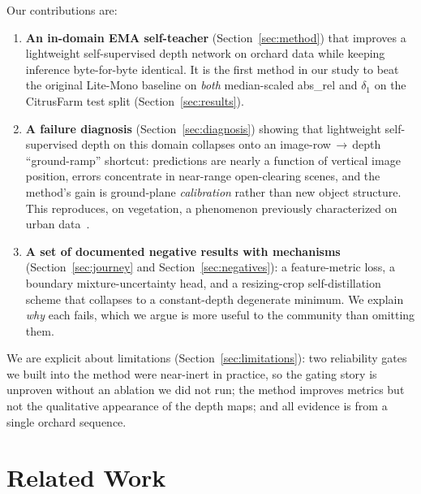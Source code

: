 \documentclass[conference]{IEEEtran}
\begin{document}
Our contributions are:
\begin{enumerate}
\item \textbf{An in-domain EMA self-teacher} (Section~\ref{sec:method}) that
improves a lightweight self-supervised depth network on orchard data while
keeping inference byte-for-byte identical. It is the first method in our study
to beat the original Lite-Mono baseline on \emph{both} median-scaled abs\_rel and
$\delta_1$ on the CitrusFarm test split (Section~\ref{sec:results}).
\item \textbf{A failure diagnosis} (Section~\ref{sec:diagnosis}) showing that
lightweight self-supervised depth on this domain collapses onto an
image-row\,$\rightarrow$\,depth ``ground-ramp'' shortcut: predictions are nearly
a function of vertical image position, errors concentrate in near-range
open-clearing scenes, and the method's gain is ground-plane \emph{calibration}
rather than new object structure. This reproduces, on vegetation, a phenomenon
previously characterized on urban data~\cite{vandijk2019howdo,peng2021epcdepth,han2023daccn}.
\item \textbf{A set of documented negative results with mechanisms}
(Section~\ref{sec:journey} and Section~\ref{sec:negatives}): a feature-metric
loss, a boundary mixture-uncertainty head, and a resizing-crop self-distillation
scheme that collapses to a constant-depth degenerate minimum. We explain
\emph{why} each fails, which we argue is more useful to the community than
omitting them.
\end{enumerate}

We are explicit about limitations (Section~\ref{sec:limitations}): two
reliability gates we built into the method were near-inert in practice, so the
gating story is unproven without an ablation we did not run; the method improves
metrics but not the qualitative appearance of the depth maps; and all evidence is
from a single orchard sequence.

\section{Related Work}
\label{sec:related}
\end{document}
